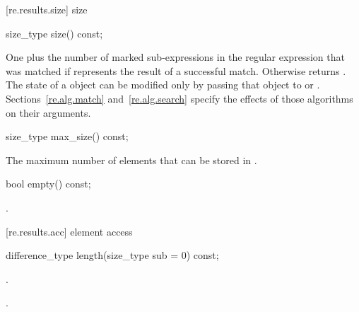 [re.results.size]{ size}

%
%
\begin{itemdecl}
size_type size() const; 
\end{itemdecl}

\begin{itemdescr}
\pnum\returns  One plus the number of marked sub-expressions in the
regular expression that was matched if  represents the
result of a successful match.  Otherwise returns .
\enternote The state of a  object can be modified
only by passing that object to  or .
Sections~\ref{re.alg.match} and~\ref{re.alg.search} specify the
effects of those algorithms on their  arguments.
\exitnote
\end{itemdescr}

%
%
\begin{itemdecl}
size_type max_size() const;
\end{itemdecl}

\begin{itemdescr}
\pnum\returns  The maximum number of  elements that can be
stored in .
\end{itemdescr} 

%
%
\begin{itemdecl}
bool empty() const;
\end{itemdecl}

\begin{itemdescr}
\pnum\returns  {}.
\end{itemdescr}

[re.results.acc]{ element access}

%
%
\begin{itemdecl}
difference_type length(size_type sub = 0) const;
\end{itemdecl}

\begin{itemdescr}
\pnum
\requires {}.

\pnum
\returns  {}.
\end{itemdescr}

